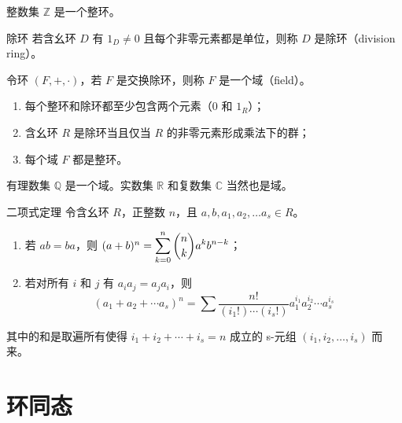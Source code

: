 \hfill

\begin{example}
  整数集 $\mathbb{Z}$ 是一个整环。
\end{example}

\hfill

\begin{definition}{除环}
  若含幺环 $D$ 有 $1_D \ne 0$ 且每个非零元素都是单位，则称 $D$ 是除环（division ring）。
\end{definition}

\begin{definition}
  令环 $(F,+,\cdot)$，若 $F$ 是交换除环，则称 $F$ 是一个域（field）。
\end{definition}

\begin{remark}
  \begin{enumerate}
    \item 每个整环和除环都至少包含两个元素（$0$ 和 $1_R$）；
    \item 含幺环 $R$ 是除环当且仅当 $R$ 的非零元素形成乘法下的群；
    \item 每个域 $F$ 都是整环。
  \end{enumerate}
\end{remark}

\hfill

\begin{example}
  有理数集 $\mathbb{Q}$ 是一个域。实数集 $\mathbb{R}$ 和复数集 $\mathbb{C}$ 当然也是域。
\end{example}

\hfill


\begin{theorem}{二项式定理}
  令含幺环 $R$，正整数 $n$，且 $a,b,a_1,a_2, \ldots a_s \in R$。
  \begin{enumerate}
    \item 若 $ab = ba$，则 $(a + b)^n = \displaystyle \sum_{k = 0}^{n}\dbinom{n}{k}a^{k}b^{n - k}$；
    \item 若对所有 $i$ 和 $j$ 有 $a_{i}a_{j} = a_{j}a_{i}$，则
    \[(a_1 + a_2 + \cdots a_s)^n = \sum\frac{n!}{(i_{1}!)\cdots(i_{s}!)}a_{1}^{i_1}a_{2}^{i_2}\cdots a_{s}^{i_s}\]
  \end{enumerate}
  其中的和是取遍所有使得 $i_1 + i_2 + \cdots + i_s = n$ 成立的 s-元组 $(i_1,i_2, \ldots ,i_s)$ 而来。
\end{theorem}





\section{环同态}

